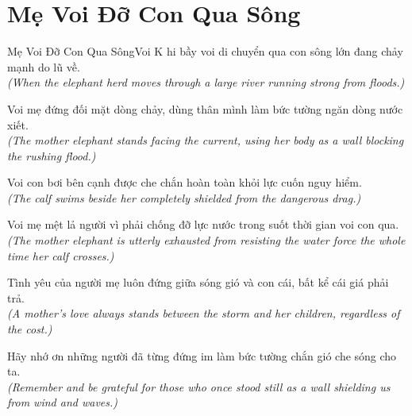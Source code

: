 \section{Mẹ Voi Đỡ Con Qua Sông}
\begin{truyen}{Mẹ Voi Đỡ Con Qua Sông}{Voi}
K hi bầy voi di chuyển qua con sông lớn đang chảy mạnh do lũ về.\\
\textit{(When the elephant herd moves through a large river running strong from floods.)}

Voi mẹ đứng đối mặt dòng chảy, dùng thân mình làm bức tường ngăn dòng nước xiết.\\
\textit{(The mother elephant stands facing the current, using her body as a wall blocking the rushing flood.)}

Voi con bơi bên cạnh được che chắn hoàn toàn khỏi lực cuốn nguy hiểm.\\
\textit{(The calf swims beside her completely shielded from the dangerous drag.)}

Voi mẹ mệt lả người vì phải chống đỡ lực nước trong suốt thời gian voi con qua.\\
\textit{(The mother elephant is utterly exhausted from resisting the water force the whole time her calf crosses.)}

Tình yêu của người mẹ luôn đứng giữa sóng gió và con cái, bất kể cái giá phải trả.\\
\textit{(A mother's love always stands between the storm and her children, regardless of the cost.)}

\end{truyen}
\begin{baihoc}
  Hãy nhớ ơn những người đã từng đứng im làm bức tường chắn gió che sóng cho ta.\\
  \textit{(Remember and be grateful for those who once stood still as a wall shielding us from wind and waves.)}
\end{baihoc}

